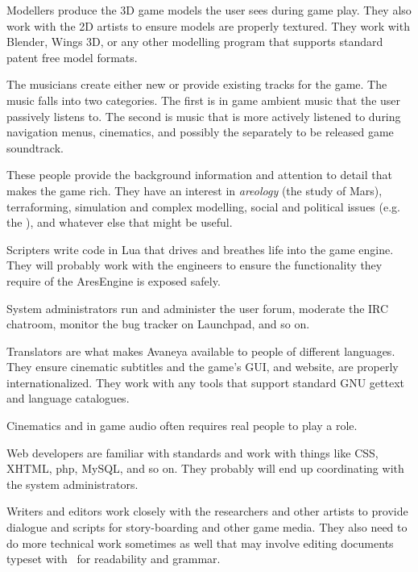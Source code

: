 Modellers produce the 3D game models the user sees during game play. They also work with the 2D artists to ensure models are properly textured. They work with Blender, Wings 3D, or any other modelling program that supports standard patent free model formats.


The musicians create either new or provide existing tracks for the game. The music falls into two categories. The first is in game ambient music that the user passively listens to. The second is music that is more actively listened to during navigation menus, cinematics, and possibly the separately to be released game soundtrack.


These people provide the background information and attention to detail that makes the game rich. They have an interest in {\it areology} (the study of Mars), terraforming, simulation and complex modelling, social and political issues (e.g. the ), and whatever else that might be useful.


Scripters write code in Lua that drives and breathes life into the game engine. They will probably work with the engineers to ensure the functionality they require of the AresEngine is exposed safely.


System administrators run and administer the user forum, moderate the IRC chatroom, monitor the bug tracker on Launchpad, and so on.


Translators are what makes Avaneya available to people of different languages. They ensure cinematic subtitles and the game's GUI, and website, are properly internationalized. They work with any tools that support standard GNU gettext and language catalogues.


Cinematics and in game audio often requires real people to play a role.


Web developers are familiar with standards and work with things like CSS, XHTML, php, MySQL, and so on. They probably will end up coordinating with the system administrators.


Writers and editors work closely with the researchers and other artists to provide dialogue and scripts for story-boarding and other game media. They also need to do more technical work sometimes as well that may involve editing documents typeset with \CONTEXT\ for readability and grammar.
\stopitemize

